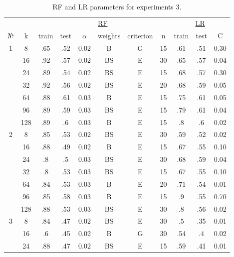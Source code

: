 \begin{table}
\centering
\caption{RF and LR parameters for experiments 3.}
\label{tab:params_3_rf_lr}
\begin{tabular}{|c|c|cccccc||ccc|}\hline
& & \multicolumn{6}{c||}{\underline{RF}} & \multicolumn{3}{c|}{\underline{LR}}\\
№ &   k & train & test & $\alpha$ & weights & criterion &  n & train & test &    C \\\hline
1 &   8 &   .65 &  .52 &     0.02 &       B &         G & 15 &   .61 &  .51 & 0.30 \\
  &  16 &   .92 &  .57 &     0.02 &      BS &         E & 30 &   .65 &  .57 & 0.04 \\
  &  24 &   .89 &  .54 &     0.02 &      BS &         E & 15 &   .68 &  .57 & 0.30 \\
  &  32 &   .92 &  .56 &     0.02 &      BS &         E & 20 &   .68 &  .59 & 0.05 \\
  &  64 &   .88 &  .61 &     0.03 &       B &         E & 15 &   .75 &  .61 & 0.05 \\
  &  96 &   .89 &  .59 &     0.03 &      BS &         E & 15 &   .79 &  .61 & 0.04 \\
  & 128 &   .89 &   .6 &     0.03 &       B &         E & 15 &    .8 &   .6 & 0.02 \\\hline
2 &   8 &   .85 &  .53 &     0.02 &      BS &         E & 30 &   .59 &  .52 & 0.02 \\
  &  16 &   .88 &  .49 &     0.02 &       B &         E & 15 &   .67 &  .55 & 0.10 \\
  &  24 &    .8 &   .5 &     0.03 &      BS &         E & 30 &   .68 &  .59 & 0.04 \\
  &  32 &    .8 &  .53 &     0.03 &      BS &         E & 15 &   .67 &  .55 & 0.10 \\
  &  64 &   .84 &  .53 &     0.03 &       B &         E & 20 &   .71 &  .54 & 0.01 \\
  &  96 &   .85 &  .58 &     0.03 &       B &         E & 15 &    .9 &  .55 & 0.70 \\
  & 128 &   .88 &  .53 &     0.03 &      BS &         E & 30 &    .8 &  .56 & 0.02 \\\hline
3 &   8 &   .84 &  .47 &     0.02 &      BS &         E & 30 &    .5 &  .35 & 0.01 \\
  &  16 &    .6 &  .45 &     0.02 &       B &         G & 30 &   .54 &   .4 & 0.02 \\
  &  24 &   .88 &  .47 &     0.02 &      BS &         E & 15 &   .59 &  .41 & 0.01 \\

\end{tabular}
\end{table}
